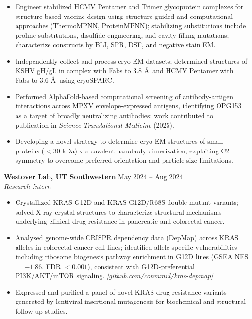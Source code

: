 \documentclass[11pt]{article}
\newcommand{\resumeSubheading}[4]{
\textbf{#1} \hfill #2\\
\textit{#3} \hfill \textit{#4}
}
\begin{document}
\begin{itemize}
\item Engineer stabilized HCMV Pentamer and Trimer glycoprotein complexes for structure-based vaccine design using structure-guided and computational approaches (ThermoMPNN, ProteinMPNN); stabilizing substitutions include proline substitutions, disulfide engineering, and cavity-filling mutations; characterize constructs by BLI, SPR, DSF, and negative stain EM.
\item Independently collect and process cryo-EM datasets; determined structures of KSHV gH/gL in complex with Fabs to 3.8 \AA\ and HCMV Pentamer with Fabs to 3.6 \AA\ using cryoSPARC.
\item Performed AlphaFold-based computational screening of antibody-antigen interactions across MPXV envelope-expressed antigens, identifying OPG153 as a target of broadly neutralizing antibodies; work contributed to publication in \textit{Science Translational Medicine} (2025).
\item Developing a novel strategy to determine cryo-EM structures of small proteins ($<$30 kDa) via covalent nanobody dimerization, exploiting C2 symmetry to overcome preferred orientation and particle size limitations.
\end{itemize}

\resumeSubheading
{Westover Lab, UT Southwestern}
{May 2024 -- Aug 2024}
{Research Intern}
{}

\begin{itemize}
\item Crystallized KRAS G12D and KRAS G12D/R68S double-mutant variants; solved X-ray crystal structures to characterize structural mechanisms underlying clinical drug resistance in pancreatic and colorectal cancer.
\item Analyzed genome-wide CRISPR dependency data (DepMap) across KRAS alleles in colorectal cancer cell lines; identified allele-specific vulnerabilities including ribosome biogenesis pathway enrichment in G12D lines (GSEA NES $= -1.86$, FDR $< 0.001$), consistent with G12D-preferential PI3K/AKT/mTOR signaling.
\textit{[\href{https://github.com/conmmul/kras-depmap}{github.com/conmmul/kras-depmap}]}
\item Expressed and purified a panel of novel KRAS drug-resistance variants generated by lentiviral insertional mutagenesis for biochemical and structural follow-up studies.
\end{itemize}

\end{document}
